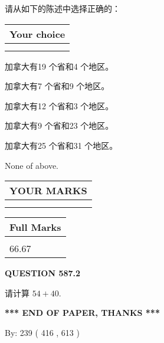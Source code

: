 \documentclass{ctexart}
\begin{document}
  
请从如下的陈述中选择正确的：
  
  
\noindent\hspace{3.0in} \begin{tabular}{|l|}
\hline
Your choice \\
\hline
 \\ 
 \\ 
\hline
\end{tabular}
  
  
 
 
加拿大有19 个省和4 个地区。
 
 
加拿大有7 个省和9 个地区。
 
 
加拿大有12 个省和3 个地区。
 
 
加拿大有9 个省和23 个地区。
 
 
加拿大有25 个省和31 个地区。
 
 
 None of above.
 
 
  
\vspace{0.2in}
  
\noindent\begin{tabular}{|l|}
\hline
 YOUR MARKS  \\
\hline
 \\ 
 \\ 
\hline
\end{tabular}
\hspace{0.05in} \begin{tabular}{|l|}
\hline
 Full Marks  \\
\hline
 \\ 
66.67 \\
\hline
\end{tabular}
{\textbf{\Large{QUESTION
587.2 
}}}
  
  
 
请计算 $ %
54 +  %
40 $.
 

 

 
   
   
 \vspace{0.2in}
 
   
   
   
   
\vspace{1.0in} 
{\textbf{\large{ *** END OF PAPER, THANKS *** }}} 
   
   
\hspace{1.0in} By: 
 239 ( 416 ,  613 )
   
\end{document}
